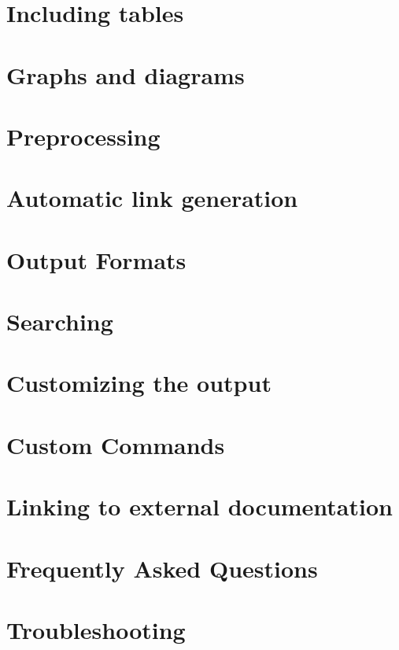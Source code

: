 \let\mypdfximage\pdfximage\def\pdfximage{\immediate\mypdfximage}\documentclass[twoside]{book}
\newcommand{\+}{\discretionary{\mbox{\scriptsize$\hookleftarrow$}}{}{}}
\begin{document}
\chapter{Including tables}
\label{tables}

\chapter{Graphs and diagrams}
\label{diagrams}

\chapter{Preprocessing}
\label{preprocessing}

\chapter{Automatic link generation}
\label{autolink}

\chapter{Output Formats}
\label{output}

\chapter{Searching}
\label{searching}

\chapter{Customizing the output}
\label{customize}

\chapter{Custom Commands}
\label{custcmd}

\chapter{Linking to external documentation}
\label{external}

\chapter{Frequently Asked Questions}
\label{faq}

\chapter{Troubleshooting}
\label{trouble}

\end{document}
